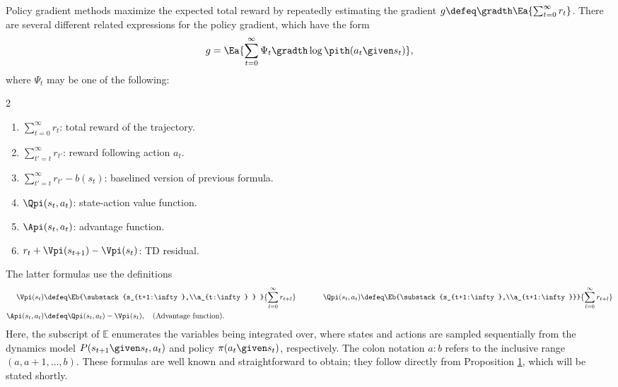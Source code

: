 \documentclass{article}
\renewcommand{\bg}{g}
\newcommand{\delay}{l}
\begin{document}
Policy gradient methods maximize the expected total reward by repeatedly estimating the gradient $\bg \defeq \gradth \Ea{\sum_{t=0}^{\infty} r_t}$.
There are several different related expressions for the policy gradient, which have the form
\begin{align}\label{eq:pg-abstract}
\bg =
\Ea{\sum_{t=0}^{\infty} \Psi_t \gradth \log \pith(a_t \given s_t)},
\end{align}
where $\Psi_t$ may be one of the following:
\begin{multicols}{2}
\begin{enumerate}
\item $\sum_{t=0}^{\infty} r_{t}$: total reward of the trajectory. \label{eq:raw-reinforce}
\item $\sum_{t'=t}^{\infty} r_{t'}$: reward following action $a_t$. \label{eq:q-reinforce}
\item $\sum_{t'=t}^{\infty} r_{t'} - b(s_t)$: baselined version of previous formula. \label{eq:q-reinforce-wb}
\item $\Qpi(s_t, a_t)$: \label{eq:qfunc-reinforce} state-action value function.
\item $\Api(s_t, a_t)$: \label{eq:adv-reinforce} advantage function.
\item $r_{t} + \Vpi(s_{t+1}) - \Vpi(s_t)$: TD residual.\label{eq:ac-reinforce}
\end{enumerate}
\end{multicols}
The latter formulas use the definitions
\begin{align}
\Vpi(s_t) &\defeq \Eb{\substack{s_{t+1:\infty},\\a_{t:\infty} } }{\sum_{\delay=0}^{\infty} r_{t+\delay}} \hspace{0.5in}
\Qpi(s_t,a_t) \defeq \Eb{\substack{s_{t+1:\infty},\\a_{t+1:\infty}}}{\sum_{\delay=0}^{\infty} r_{t+\delay}} \\
\Api(s_t, a_t) &\defeq \Qpi(s_t, a_t) - \Vpi(s_t), \quad \text{(Advantage function)}.
\end{align}
Here, the subscript of $\mathbb{E}$ enumerates the variables being integrated over, where states and actions are sampled sequentially from the dynamics model $P(s_{t+1} \given s_t, a_t)$ and policy $\pi(a_t \given s_t)$, respectively.
The colon notation $a:b$ refers to the inclusive range $(a,a+1,\dots,b)$.
These formulas are well known and straightforward to obtain; they follow directly from Proposition \hyperlink{justprop}{1}, which will be stated shortly.
\end{document}
